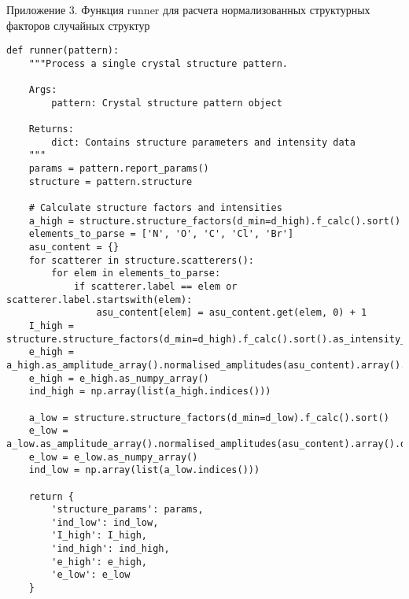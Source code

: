 \begin{center}
Приложение 3. Функция runner для расчета нормализованных структурных факторов случайных структур
\end{center}
\begin{verbatim}
def runner(pattern):
    """Process a single crystal structure pattern.
    
    Args:
        pattern: Crystal structure pattern object
        
    Returns:
        dict: Contains structure parameters and intensity data
    """
    params = pattern.report_params()
    structure = pattern.structure
    
    # Calculate structure factors and intensities
    a_high = structure.structure_factors(d_min=d_high).f_calc().sort()
    elements_to_parse = ['N', 'O', 'C', 'Cl', 'Br']
    asu_content = {}
    for scatterer in structure.scatterers():
        for elem in elements_to_parse:
            if scatterer.label == elem or scatterer.label.startswith(elem):
                asu_content[elem] = asu_content.get(elem, 0) + 1
    I_high = structure.structure_factors(d_min=d_high).f_calc().sort().as_intensity_array()
    e_high = a_high.as_amplitude_array().normalised_amplitudes(asu_content).array().data()
    e_high = e_high.as_numpy_array()
    ind_high = np.array(list(a_high.indices()))
    
    a_low = structure.structure_factors(d_min=d_low).f_calc().sort()
    e_low = a_low.as_amplitude_array().normalised_amplitudes(asu_content).array().data()
    e_low = e_low.as_numpy_array()
    ind_low = np.array(list(a_low.indices()))
    
    return {
        'structure_params': params,
        'ind_low': ind_low,
        'I_high': I_high,
        'ind_high': ind_high,
        'e_high': e_high,
        'e_low': e_low
    }
\end{verbatim}
\newpage

